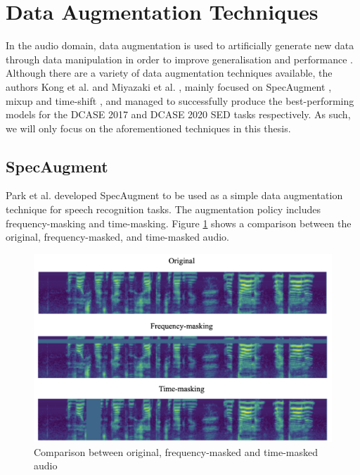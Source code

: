 \section{Data Augmentation Techniques}
In the audio domain, data augmentation is used to artificially generate new data through data manipulation in order to improve generalisation and performance \cite{Wei_2020}. Although there are a variety of data augmentation techniques available, the authors Kong et al. \cite{kong2020sound} and Miyazaki et al. \cite{Miyazaki2020CONFORMERBASEDSE}, mainly focused on SpecAugment \cite{specaugment}, mixup \cite{mixup} and time-shift \cite{timeshift}, and managed to successfully produce the best-performing models for the DCASE 2017 and DCASE 2020 SED tasks respectively. As such, we will only focus on the aforementioned techniques in this thesis.

\subsection{SpecAugment}
Park et al. \cite{specaugment} developed SpecAugment to be used as a simple data augmentation technique for speech recognition tasks. The augmentation policy includes frequency-masking and time-masking. Figure \ref{fig:specaugment} shows a comparison between the original, frequency-masked, and time-masked audio.\\

\begin{figure}[!htb]
    \centering
    \includegraphics[width=\textwidth]{fig/specaugment.png}
    \caption{Comparison between original, frequency-masked and time-masked audio}
    \label{fig:specaugment}
\end{figure}

